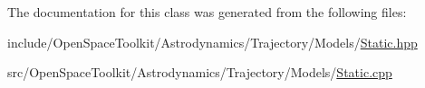 The documentation for this class was generated from the following files\+:\begin{DoxyCompactItemize}
\item 
include/\+Open\+Space\+Toolkit/\+Astrodynamics/\+Trajectory/\+Models/\hyperlink{_static_8hpp}{Static.\+hpp}\item 
src/\+Open\+Space\+Toolkit/\+Astrodynamics/\+Trajectory/\+Models/\hyperlink{_static_8cpp}{Static.\+cpp}\end{DoxyCompactItemize}
